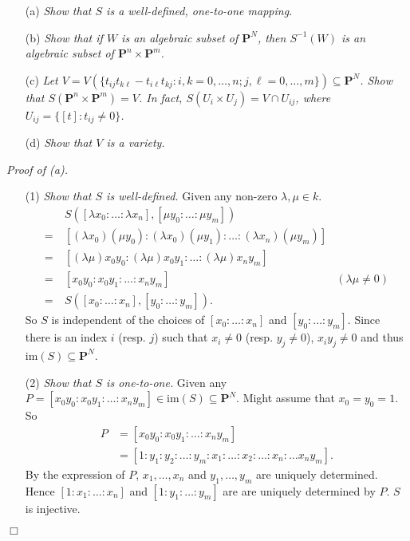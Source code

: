 \documentclass{article}
\begin{document}
\begin{enumerate}
\item[(a)]
  \emph{Show that $S$ is a well-defined, one-to-one mapping.}

\item[(b)]
  \emph{Show that if $W$ is an algebraic subset of $\mathbf{P}^{N}$,
  then $S^{-1}(W)$ is an algebraic subset of $\mathbf{P}^{n} \times \mathbf{P}^{m}$.}

\item[(c)]
  \emph{Let $V = V( \{ t_{ij}t_{k\ell}-t_{i\ell}t_{kj} : i,k = 0,\ldots,n; j,\ell = 0,\ldots,m \})
  \subseteq \mathbf{P}^{N}$.
  Show that $S(\mathbf{P}^{n} \times \mathbf{P}^{m}) = V$.
  In fact, $S(U_i \times U_j) = V \cap U_{ij}$,
  where $U_{ij} = \{ [t] : t_{ij} \neq 0 \}$.}

\item[(d)]
  \emph{Show that $V$ is a variety.} \\
\end{enumerate}



\emph{Proof of (a).}
\begin{enumerate}
\item[(1)]
  \emph{Show that $S$ is well-defined.}
  Given any non-zero $\lambda, \mu \in k$.
  \begin{align*}
    & \:
    S([\lambda x_0 : \ldots : \lambda x_n], [\mu y_0 : \ldots : \mu y_m]) \\
    = & \:
    [(\lambda x_0)(\mu y_0) : (\lambda x_0)(\mu y_1) : \ldots : (\lambda x_n)(\mu y_m)] \\
    = & \:
    [(\lambda\mu) x_0 y_0 : (\lambda\mu) x_0 y_1 : \ldots : (\lambda\mu) x_n y_m] \\
    = & \:
    [x_0 y_0 : x_0 y_1 : \ldots : x_n y_m]
      &(\lambda\mu \neq 0) \\
    = & \:
    S([x_0 : \ldots : x_n], [y_0 : \ldots : y_m]).
  \end{align*}
  So $S$ is independent of the choices of $[x_0 : \ldots : x_n]$ and $[y_0 : \ldots : y_m]$.
  Since there is an index $i$ (resp. $j$) such that $x_i \neq 0$ (resp. $y_j \neq 0$),
  $x_i y_j \neq 0$ and thus $\mathrm{im}(S) \subseteq \mathbf{P}^{N}$.

\item[(2)]
  \emph{Show that $S$ is one-to-one.}
  Given any $P = [x_0 y_0 : x_0 y_1 : \ldots : x_n y_m] \in \mathrm{im}(S) \subseteq \mathbf{P}^{N}$.
  Might assume that $x_0 = y_0 = 1$. So
  \begin{align*}
    P
    &= [x_0 y_0 : x_0 y_1 : \ldots : x_n y_m] \\
    &= [1 : y_1 : y_2 : \ldots : y_m : x_1 :\ldots : x_2 : \ldots : x_n : \ldots x_n y_m].
  \end{align*}
  By the expression of $P$,
  $x_1, \ldots, x_n$ and $y_1, \ldots, y_m$ are uniquely determined.
  Hence $[1 : x_1 : \ldots : x_n]$ and $[1 : y_1 : \ldots : y_m]$
  are are uniquely determined by $P$.
  $S$ is injective.
\end{enumerate}
$\Box$ \\
\end{document}
